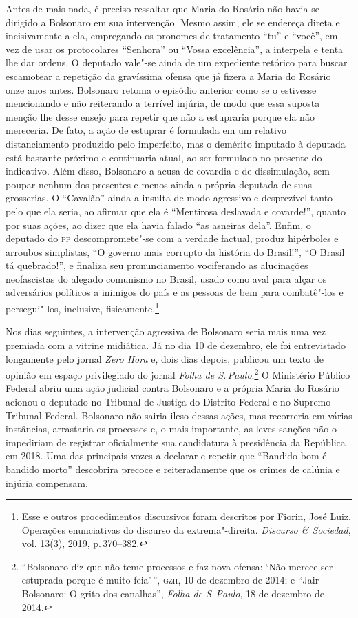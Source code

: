 Antes de mais nada, é preciso ressaltar que Maria do Rosário não havia
se dirigido a Bolsonaro em sua intervenção. Mesmo assim, ele se endereça
direta e incisivamente a ela, empregando os pronomes de tratamento
``tu'' e ``você'', em vez de usar os protocolares ``Senhora'' ou ``Vossa
excelência'', a interpela e tenta lhe dar ordens. O deputado vale"-se
ainda de um expediente retórico para buscar escamotear a repetição da
gravíssima ofensa que já fizera a Maria do Rosário onze anos antes.
Bolsonaro retoma o episódio anterior como se o estivesse mencionando e
não reiterando a terrível injúria, de modo que essa suposta menção lhe
desse ensejo para repetir que não a estupraria porque ela não mereceria.
De fato, a ação de estuprar é formulada em um relativo distanciamento
produzido pelo imperfeito, mas o demérito imputado à deputada está
bastante próximo e continuaria atual, ao ser formulado no presente do
indicativo. Além disso, Bolsonaro a acusa de covardia e de dissimulação,
sem poupar nenhum dos presentes e menos ainda a própria deputada de suas
grosserias. O ``Cavalão'' ainda a insulta de modo agressivo e
desprezível tanto pelo que ela seria, ao afirmar que ela é ``Mentirosa
deslavada e covarde!'', quanto por suas ações, ao dizer que ela havia
falado ``as asneiras dela''. Enfim, o deputado do \textsc{pp} descompromete"-se
com a verdade factual, produz hipérboles e arroubos simplistas, ``O
governo mais corrupto da história do Brasil!'', ``O Brasil tá
quebrado!'', e finaliza seu pronunciamento vociferando as alucinações
neofascistas do alegado comunismo no Brasil, usado como aval para alçar
os adversários políticos a inimigos do país e as pessoas de bem para
combatê"-los e persegui"-los, inclusive, fisicamente.\footnote{Esse e
  outros procedimentos discursivos foram descritos por Fiorin, José
  Luiz. Operações enunciativas do discurso da extrema"-direita.
  \emph{Discurso \& Sociedad}, vol. 13(3), 2019, p.\,370--382.}

Nos dias seguintes, a intervenção agressiva de Bolsonaro seria mais uma
vez premiada com a vitrine midiática. Já no dia 10 de dezembro, ele foi
entrevistado longamente pelo jornal \emph{Zero Hora} e, dois dias
depois, publicou um texto de opinião em espaço privilegiado do jornal
\emph{Folha de S.\,Paulo}.\footnote{``Bolsonaro diz que não teme processos e faz nova ofensa: `Não merece ser estuprada porque é muito feia'\,'', \textsc{gzh}, 10 de dezembro de 2014; e ``Jair Bolsonaro: O grito dos canalhas'', \textit{Folha de S.\,Paulo}, 18 de dezembro de 2014.}
O Ministério Público Federal abriu uma ação judicial contra Bolsonaro e
a própria Maria do Rosário acionou o deputado no Tribunal de Justiça do
Distrito Federal e no Supremo Tribunal Federal. Bolsonaro não sairia
ileso dessas ações, mas recorreria em várias instâncias, arrastaria os
processos e, o mais importante, as leves sanções não o impediriam de
registrar oficialmente sua candidatura à presidência da República em
2018. Uma das principais vozes a declarar e repetir que ``Bandido bom é
bandido morto'' descobrira precoce e reiteradamente que os crimes de
calúnia e injúria compensam.

